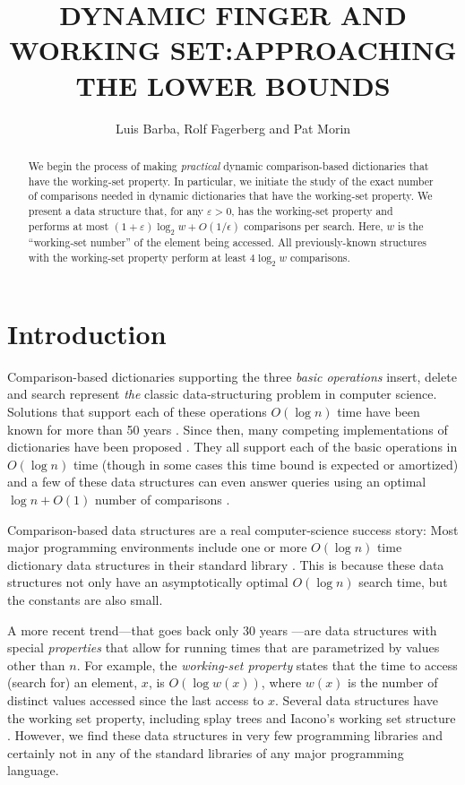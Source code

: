 \documentclass[lotsofwhite]{patmorin}
\title{\MakeUppercase{Dynamic Finger and Working Set:\newline Approaching the Lower Bounds}}
\author{Luis Barba, Rolf Fagerberg and Pat Morin}
\newcommand{\eps}{\varepsilon}
\begin{document}
\begin{titlepage}
\maketitle

\begin{abstract}
  We begin the process of making \emph{practical} dynamic comparison-based
  dictionaries that have the working-set property.  In particular,
  we initiate the study of the exact number of comparisons needed in
  dynamic dictionaries that have the working-set property.  We present a
  data structure that, for any $\eps > 0$, has the working-set property
  and performs at most $(1+\eps)\log_2 w+O(1/\epsilon)$ comparisons per
  search.  Here, $w$ is the ``working-set number'' of the element being
  accessed.  All previously-known structures with the working-set property
  perform at least $4\log_2 w$ comparisons.
\end{abstract}

\end{titlepage}

\section{Introduction}

Comparison-based dictionaries supporting the three \emph{basic operations}
insert, delete and search represent \emph{the} classic data-structuring
problem in computer science.  Solutions that support each of these
operations $O(\log n)$ time have been known for more than 50 years
\cite{avl}.  Since then, many competing implementations of dictionaries
have been proposed \cite{X}.  They all support each of the basic
operations in $O(\log n)$ time (though in some cases this time bound is
expected or amortized) and a few of these data structures can even answer
queries using an optimal $\log n + O(1)$ number of comparisons \cite{X,Y}.

Comparison-based data structures are a real
computer-science success story: Most major programming environments
include one or more $O(\log n)$ time dictionary data structures in their
standard library \cite{S}.  This is because these data structures not
only have an asymptotically optimal $O(\log n)$ search time, but the
constants are also small.

A more recent trend---that goes back only 30 years \cite{X}---are data
structures with special \emph{properties} that allow for running
times that are parametrized by values other than $n$.  For example,
the \emph{working-set property} states that the time to access (search
for) an element, $x$, is $O(\log w(x))$, where $w(x)$ is the number
of distinct values accessed since the last access to $x$. Several data
structures have the working set property, including splay trees \cite{S}
and Iacono's working set structure \cite{S}.  However, we find
these data structures in very few programming libraries and certainly
not in any of the standard libraries of any major programming language.
\end{document}

